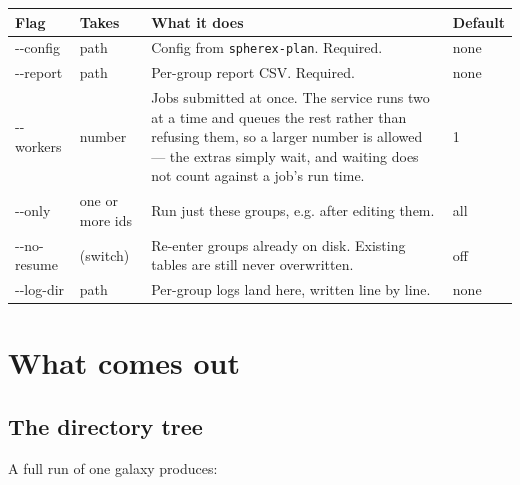 \documentclass[11pt]{article}
\begin{document}
\begin{longtable}{T{2.9cm} L{2.15cm} L{6.45cm} L{2.7cm}}
\toprule
\textbf{\normalfont Flag} & \textbf{Takes} & \textbf{What it does} & \textbf{Default} \\
\midrule
\endhead
-{}-config & path & Config from \texttt{spherex-plan}. Required. & none \\[2pt]
-{}-report & path & Per-group report CSV. Required. & none \\[2pt]
-{}-workers & number & Jobs submitted at once. The service runs two at a
  time and queues the rest rather than refusing them, so a larger number is
  allowed --- the extras simply wait, and waiting does not count against a
  job's run time. & 1 \\[2pt]
-{}-only & one or more ids & Run just these groups, e.g. after editing
  them. & all \\[2pt]
-{}-no-resume & (switch) & Re-enter groups already on disk. Existing tables
  are still never overwritten. & off \\[2pt]
-{}-log-dir & path & Per-group logs land here, written line by line. &
  none \\
\bottomrule
\end{longtable}

\section{What comes out}

\subsection{The directory tree}

A full run of one galaxy produces:
\end{document}
